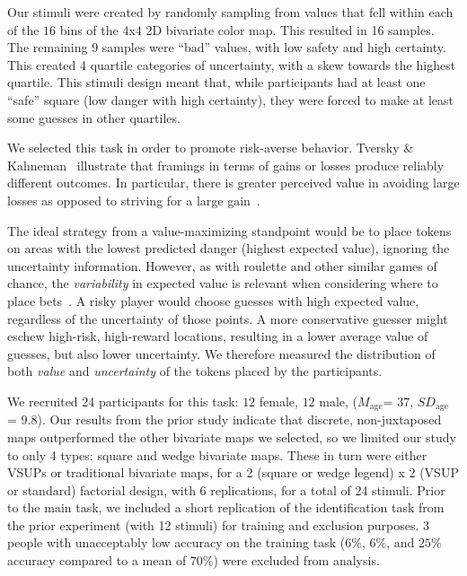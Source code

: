 Our stimuli were created by randomly sampling from values that fell within each of the $16$ bins of the $4$x$4$ 2D bivariate color map. This resulted in 16 samples. The remaining 9 samples were ``bad'' values, with low safety and high certainty. This created 4 quartile categories of uncertainty, with a skew towards the highest quartile. This stimuli design meant that, while participants had at least one ``safe'' square (low danger with high certainty), they were forced to make at least some guesses in other quartiles.

We selected this task in order to promote risk-averse behavior. Tversky \& Kahneman~\cite{tversky1985framing} illustrate that framings in terms of gains or losses produce reliably different outcomes. In particular, there is greater perceived value in avoiding large losses as opposed to striving for a large gain~\cite{kahneman1979prospect}. 

The ideal strategy from a value-maximizing standpoint would be to place tokens on areas with the lowest predicted danger (highest expected value), ignoring the uncertainty information. However, as with roulette and other similar games of chance, the \emph{variability} in expected value is relevant when considering where to place bets~\cite{mlodinow2009drunkard}. A risky player would choose guesses with high expected value, regardless of the uncertainty of those points. A more conservative guesser might eschew high-risk, high-reward locations, resulting in a lower average value of guesses, but also lower uncertainty. We therefore measured the distribution of both \emph{value} and \emph{uncertainty} of the tokens placed by the participants.

 We recruited 24 participants for this task: $12$ female, $12$ male, ($M_{\text{age}}$= $37$, $SD_{\text{age}}$ = $9.8$). Our results from the prior study indicate that discrete, non-juxtaposed maps outperformed the other bivariate maps we selected, so we limited our study to only 4 types: square and wedge bivariate maps. These in turn were either VSUPs or traditional bivariate maps, for a 2 (square or wedge legend) x 2 (VSUP or standard) factorial design, with 6 replications, for a total of 24 stimuli. Prior to the main task, we included a short replication of the identification task from the prior experiment (with 12 stimuli) for training and exclusion purposes. 3 people with unacceptably low accuracy on the training task ($6\%$, $6\%$, and $25\%$ accuracy compared to a mean of $70\%$) were excluded from analysis. 

